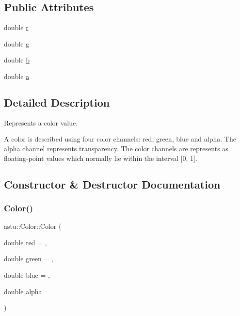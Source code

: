 \subsection*{Public Attributes}
\begin{DoxyCompactItemize}
\item 
double \hyperlink{classastu_1_1Color_ae1714e0caca40451f75a6b31648c6fee}{r}
\item 
double \hyperlink{classastu_1_1Color_a513c1a3bd9b8c4268efafba56bda0823}{g}
\item 
double \hyperlink{classastu_1_1Color_a3eaf42ee466c2e128373f5ddcb12d34c}{b}
\item 
double \hyperlink{classastu_1_1Color_a001a2dcf8f1f0d4abb97f8c158bfddec}{a}
\end{DoxyCompactItemize}


\subsection{Detailed Description}
Represents a color value.

A color is described using four color channels\+: red, green, blue and alpha. The alpha channel represents transparency. The color channels are represents as floating-\/point values which normally lie within the interval \mbox{[}0, 1\mbox{]}. 

\subsection{Constructor \& Destructor Documentation}
\mbox{\label{classastu_1_1Color_a3b4505ef24790685a5e22bde22ff5b05}} 
\subsubsection{\texorpdfstring{Color()}{Color()}\hspace{0.1cm}{\footnotesize\ttfamily [1/2]}}
{\footnotesize\ttfamily astu\+::\+Color\+::\+Color (\begin{DoxyParamCaption}\item[{double}]{red = {},  }\item[{double}]{green = {},  }\item[{double}]{blue = {},  }\item[{double}]{alpha = {} }\end{DoxyParamCaption})}

